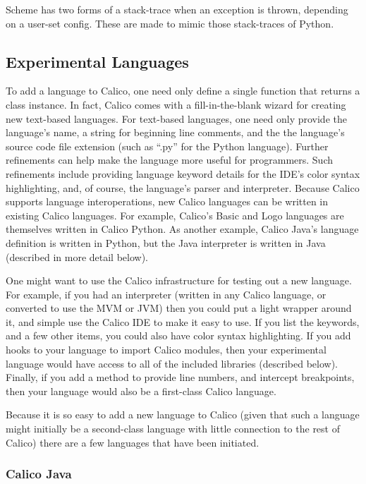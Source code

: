 \documentclass[preprint]{sigplanconf}
\begin{document}
Scheme has two forms of a stack-trace when an exception is thrown,
depending on a user-set config. These are made to mimic those
stack-traces of Python.

\subsection{Experimental Languages}

To add a language to Calico, one need only define a single function
that returns a class instance. In fact, Calico comes with a
fill-in-the-blank wizard for creating new text-based languages. For
text-based languages, one need only provide the language's name, a
string for beginning line comments, and the the language's source code
file extension (such as ``.py'' for the Python language). Further
refinements can help make the language more useful for
programmers. Such refinements include providing language keyword
details for the IDE's color syntax highlighting, and, of course, the
language's parser and interpreter. Because Calico supports language
interoperations, new Calico languages can be written in existing
Calico languages. For example, Calico's Basic and Logo languages are
themselves written in Calico Python. As another example, Calico Java's
language definition is written in Python, but the Java interpreter is
written in Java (described in more detail below).

One might want to use the Calico infrastructure for testing out a new
language. For example, if you had an interpreter (written in any
Calico language, or converted to use the MVM or JVM) then you could
put a light wrapper around it, and simple use the Calico IDE to make
it easy to use. If you list the keywords, and a few other items, you
could also have color syntax highlighting. If you add hooks to your
language to import Calico modules, then your experimental language
would have access to all of the included libraries (described
below). Finally, if you add a method to provide line numbers, and
intercept breakpoints, then your language would also be a first-class
Calico language.

Because it is so easy to add a new language to Calico (given that such
a language might initially be a second-class language with little
connection to the rest of Calico) there are a few languages that have
been initiated.

\subsubsection{Calico Java}
\end{document}
